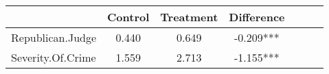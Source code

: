 \begin{tabular}{l*{6}{c}}
                    &     Control&   Treatment&  Difference   \\
\hline
Republican.Judge    &       0.440&       0.649&      -0.209***\\
Severity.Of.Crime   &       1.559&       2.713&      -1.155***\\
\end{tabular}
